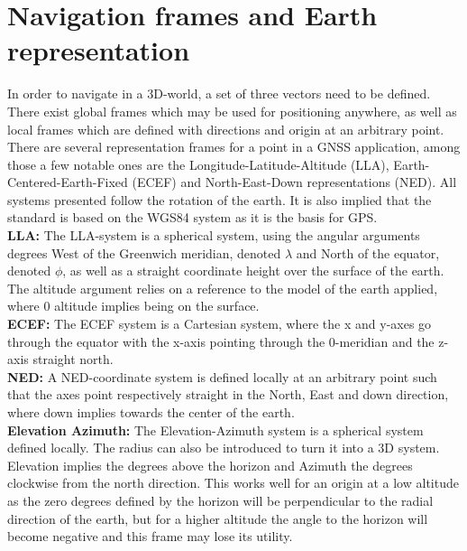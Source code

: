 \section{Navigation frames and Earth representation}
In order to navigate in a 3D-world, a set of three vectors need to be defined. There exist global frames which may be used for positioning anywhere, as well as local frames which are defined with directions and origin at an arbitrary point. There are several representation frames for a point in a GNSS application, among those a few notable ones are the Longitude-Latitude-Altitude (LLA), Earth-Centered-Earth-Fixed (ECEF) and North-East-Down representations (NED). All systems presented follow the rotation of the earth. It is also implied that the standard is based on the WGS84 system as it is the basis for GPS.\\
\textbf{LLA:}
The LLA-system is a spherical system, using the angular arguments degrees West of the Greenwich meridian, denoted $\lambda$ and North of the equator, denoted $\phi$, as well as a straight coordinate height over the surface of the earth. The altitude argument relies on a reference to the model of the earth applied, where 0 altitude implies being on the surface. \\
\textbf{ECEF:} The ECEF system is a Cartesian system, where the x and y-axes go through the equator with the x-axis pointing through the 0-meridian and the z-axis straight north.\\
\textbf{NED:} A NED-coordinate system is defined locally at an arbitrary point such that the axes point respectively straight in the North, East and down direction, where down implies towards the center of the earth.\\
\textbf{Elevation Azimuth:}
The Elevation-Azimuth system is a spherical system defined locally. The radius can also be introduced to turn it into a 3D system. Elevation implies the degrees above the horizon and Azimuth the degrees clockwise from the north direction. This works well for an origin at a low altitude as the zero degrees defined by the horizon will be perpendicular to the radial direction of the earth, but for a higher altitude the angle to the horizon will become negative and this frame may lose its utility.

